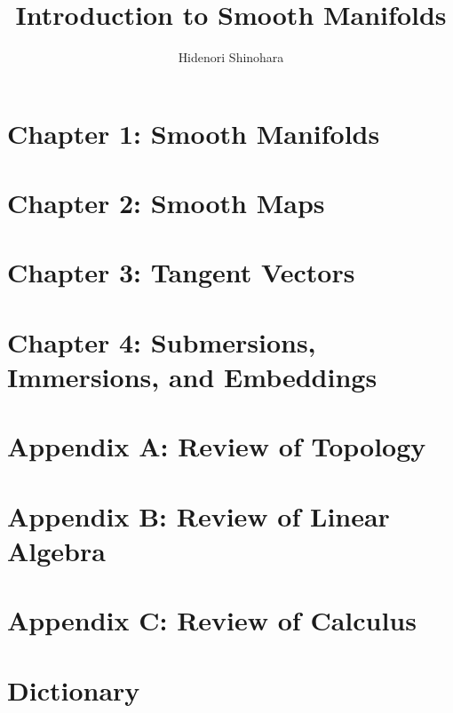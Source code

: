 \documentclass[psamsfonts]{amsart}
\theoremstyle{definition}
\theoremstyle{remark}
\numberwithin{equation}{section}
\begin{document}
\title{Introduction to Smooth Manifolds}
\author{Hidenori Shinohara}

\maketitle
\tableofcontents

\section{Chapter 1: Smooth Manifolds}


\section{Chapter 2: Smooth Maps}


\section{Chapter 3: Tangent Vectors}


\section{Chapter 4: Submersions, Immersions, and Embeddings}


\section{Appendix A: Review of Topology}


\section{Appendix B: Review of Linear Algebra}


\section{Appendix C: Review of Calculus}


\section{Dictionary}

\end{document}
